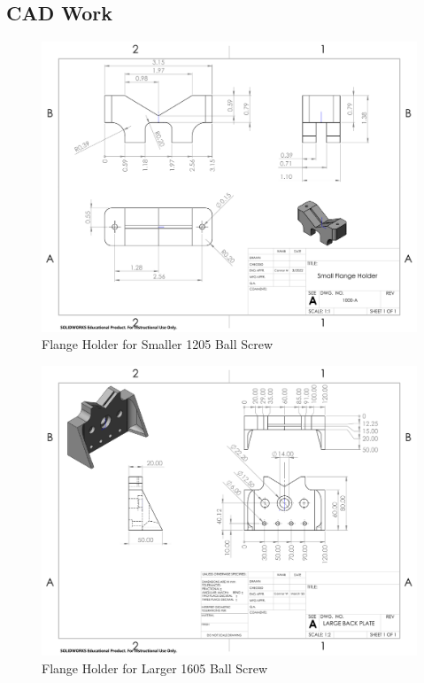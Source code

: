 \documentclass[journal]{IEEEtran}
\begin{document}
    \subsection{CAD Work}
        \begin{figure}[H]
            \centering
            \includegraphics[scale = 0.7]{Images/Small_flange_dwg.pdf}
            \caption{Flange Holder for Smaller 1205 Ball Screw}
            \label{fig:small_flange_dwg}
        \end{figure}
        
        \newpage
        \quad
        \newpage
        
        \begin{figure}[H]
            \centering
            \includegraphics[scale = 0.7]{backplate_winter2022}
            \caption{Flange Holder for Larger 1605 Ball Screw}
            \label{fig:large_flange_dwg}
        \end{figure}
        
\end{document}
